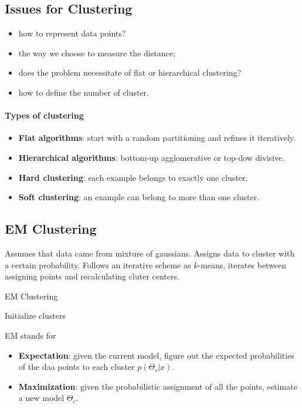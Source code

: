\documentclass[a4paper,6pt,twocolumn,fleqn]{article}
\begin{document}
\subsection{Issues for Clustering}
\begin{itemize}
    \item how to represent data points?
    \item the way we choose to measure the distance;
    \item does the problem necessitate of flat or hierarchical clustering?
    \item how to define the number of cluster.
\end{itemize}
\paragraph{Types of clustering}
\begin{itemize}
    \item \textbf{Flat algorithms}: start with a random partitioning and refines it iteratively.
    \item \textbf{Hierarchical algorithms}: bottom-up agglomerative or top-dow divisive.
    \item \textbf{Hard clustering}: each example belongs to exactly one cluster.
    \item \textbf{Soft clustering}: an example can belong to more than one cluster.
\end{itemize}
\subsection{EM Clustering} %
Assumes that data came from mixture of gaussians. Assigns data to cluster with a certain probability. Follows an iterative scheme as \(k\)-means, iterates between assigning points and recalculating cluter centers.
\begin{algorithm}
    \caption{EM Clustering}
Initialize clusters\;
\end{algorithm}
EM stands for
\begin{itemize}
    \item \textbf{Expectation}: given the current model, figure out the expected probabilities of the daa points to each cluster \(p(\Theta_c|x)\).
    \item \textbf{Maximization}: given the probabilistic assignment of all the points, estimate a new model \(\Theta_c\).
\end{itemize}
\end{document}
